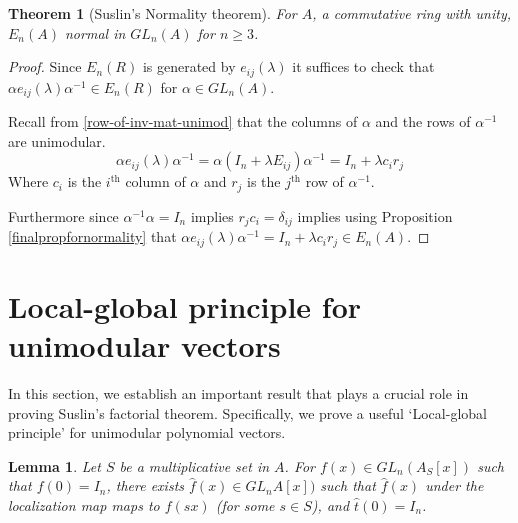 \documentclass[12pt]{report}
\numberwithin{equation}{section}
\newcounter{dummy} \numberwithin{dummy}{section}
\newtheorem{theorem}[dummy]{Theorem}
\newtheorem{lemma}[dummy]{Lemma}
\newtheorem{proposition}[dummy]{Proposition}
\begin{document}
	\begin{theorem}[Suslin's Normality theorem]
		For $A$, a commutative ring with unity, $E_n(A)$ normal in $GL_n(A)$ for $n \geq 3$. 
	\end{theorem}
	\begin{proof}
		Since $E_n(R)$ is generated by $e_{ij} (\lambda) $ it suffices to check that $\alpha e_{ij}(\lambda) \alpha^{-1} \in E_n(R)$ for $\alpha \in GL_n(A)$.
		
		 Recall from \ref{row-of-inv-mat-unimod} that the columns of $\alpha$ and the rows of $\alpha^{-1}$ are unimodular.
		\[ \alpha e_{ij} (\lambda ) \alpha^{-1}= \alpha(I_n+\lambda E_{ij}) \alpha^{-1} = I_n +\lambda c_i r_j\]
		Where $c_i$ is the $i^\mathrm{th}$ column of $\alpha$ and $r_j$ is the $j^{\mathrm{th}}$ row of $\alpha^{-1}$.
		
		Furthermore since $\alpha^{-1}\alpha =I_n $ implies $r_jc_i=\delta_{ij} $ implies using Proposition \ref{finalpropfornormality} that $\alpha e_{ij}(\lambda) \alpha^{-1} = I_n + \lambda c_i r_j \in E_n(A)$.
	\end{proof}
	
		\section{Local-global principle for unimodular vectors}
		In this section, we establish an important result that plays a crucial role in proving Suslin’s factorial theorem. Specifically, we prove a useful `Local-global principle' for unimodular polynomial vectors.
		
		
		\begin{lemma}\label{lemlocalglobal}
			Let $S$ be a multiplicative set in $A$. For $f(x) \in GL_n(A_S[x])$ such that $f(0) = I_n$, there exists $\hat{f}(x) \in GL_nA[x])$ such that $\hat{f}(x)$ under the localization map maps to $f(sx)$ (for some $s \in S$), and $\hat{t}(0) = I_n$.
		\end{lemma}
		
\end{document}
